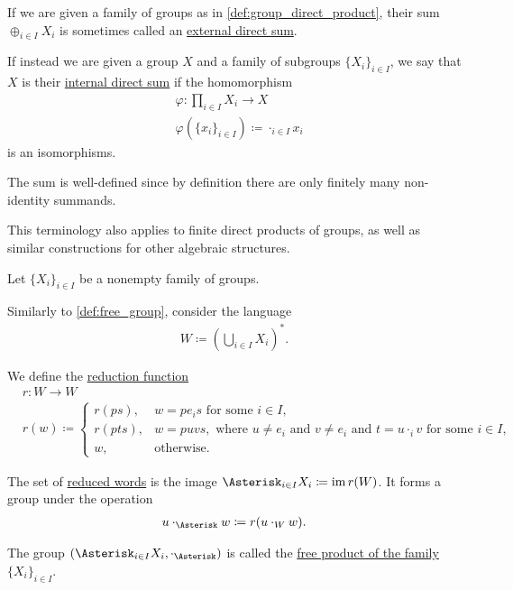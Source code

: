 \begin{note}\label{def:group_direct_sum_external_internal}\cite[126]{Knapp2016BAlg}
  If we are given a family of groups as in \cref{def:group_direct_product}, their sum $\oplus_{i \in I} X_i$ is sometimes called an \uline{external direct sum}.

  If instead we are given a group $X$ and a family of subgroups $\{ X_i \}_{i \in I}$, we say that $X$ is their \uline{internal direct sum} if the homomorphism
  \begin{align*}
    &\varphi: \prod_{i \in I} X_i \to X \\
    &\varphi(\{ x_i \}_{i \in I}) \coloneqq \cdot_{i \in I} x_i
  \end{align*}
  is an isomorphisms.

  The sum is well-defined since by definition there are only finitely many non-identity summands.

  This terminology also applies to finite direct products of groups, as well as similar constructions for other algebraic structures.
\end{note}

\begin{definition}\label{def:group_free_product}\cite[323]{Knapp2016BAlg}
  Let $\{ X_i \}_{i \in I}$ be a nonempty family of groups.

  Similarly to \cref{def:free_group}, consider the language
  \begin{align*}
    W \coloneqq \left( \bigcup_{i \in I} X_i \right)^{*}.
  \end{align*}

  We define the \uline{reduction function}
  \begin{align*}
    &r: W \to W \\
    &r(w) \coloneqq \begin{cases}
      r(ps), &w = p e_i s \text{ for some } i \in I, \\
      r(pts), &w = puvs, \text{ where } u \neq e_i \text{ and } v \neq e_i \text{ and } t = u \cdot_i v \text{ for some } i \in I, \\
      w, &\text{otherwise}.
    \end{cases}
  \end{align*}

  The set of \uline{reduced words} is the image $\Asterisk_{i \in I} X_i \coloneqq \Img r(W)$. It forms a group under the operation
  \begin{align*}
    u \cdot_\Asterisk w \coloneqq r(u \cdot_{W} w).
  \end{align*}

  The group $(\Asterisk_{i \in I} X_i, \cdot_\Asterisk)$ is called the \uline{free product of the family $\{ X_i \}_{i \in I}$}.
\end{definition}

